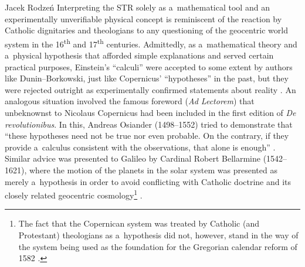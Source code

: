 \begin{artengenv}{Jacek Rodzeń}
Interpreting the STR solely as a~mathematical tool and an experimentally unverifiable physical concept is reminiscent of the reaction by Catholic dignitaries and theologians to any questioning of the geocentric world system in the 16\textsuperscript{th} and 17\textsuperscript{th} centuries. Admittedly, as a~mathematical theory and a~physical hypothesis that afforded simple explanations and served certain practical purposes, Einstein's ``calculi'' were accepted to some extent by authors like Dunin–Borkowski, just like Copernicus' ``hypotheses'' in the past, but they were rejected outright as experimentally confirmed statements about reality
\parencite[cf.][p.121]{benk_moderne_2000}. %
 An analogous situation involved the famous foreword (\textit{Ad Lectorem}) that unbeknownst to Nicolaus Copernicus had been included in the first edition of \textit{De revolutionibus}. In this, Andreas Osiander (1498–1552) tried to demonstrate that ``these hypotheses need not be true nor even probable. On the contrary, if they provide a~calculus consistent with the observations, that alone is enough'' 
\parencite[][p.XVI]{osiander_foreword_1978}. %
 Similar advice was presented to Galileo by Cardinal Robert Bellarmine (1542–1621), where the motion of the planets in the solar system was presented as merely a~hypothesis in order to avoid conflicting with Catholic doctrine and its closely related geocentric cosmology\footnote{The fact that the Copernican system was treated by Catholic (and Protestant) theologians as a~hypothesis did not, however, stand in the way of the system being used as the foundation for the Gregorian calendar reform of 1582 
\parencite[cf.][p.326]{crombie_augustine_1953}.%
}  
\parencite[on the various ways of understanding the concept of ``hypothesis,'' from antiquity to Newton, see the work of][pp.23–52]{koyre_newtonian_1968}.%


\end{artengenv}
